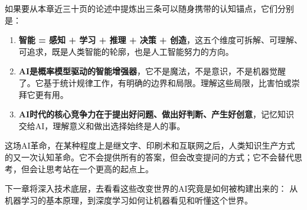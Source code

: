 如果要从本章近三十页的论述中提炼出三条可以随身携带的认知锚点，它们分别是：

\begin{enumerate}[leftmargin=*, itemsep=4pt]
\item \textbf{智能 = 感知 + 学习 + 推理 + 决策 + 创造}，这五个维度可拆解、可理解、可追求，既是人类智能的轮廓，也是人工智能努力的方向。

\item \textbf{AI是概率模型驱动的智能增强器}，它不是魔法，不是意识，不是机器觉醒了。它基于统计规律工作，有明确的边界和局限。理解这些局限，比害怕或崇拜它更有用。

\item \textbf{AI时代的核心竞争力在于提出好问题、做出好判断、产生好创意}，记忆知识交给AI，理解意义和做出选择始终是人的事。
\end{enumerate}

这场AI革命，在某种程度上是继文字、印刷术和互联网之后，人类知识生产方式的又一次认知革命。它不会提供所有的答案，但会改变提问的方式；它不会替代思考，但会让思考站在一个更高的起点上。

下一章将深入技术底层，去看看这些改变世界的AI究竟是如何被构建出来的：
从机器学习的基本原理，到深度学习如何让机器看见和听懂这个世界。